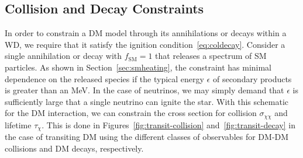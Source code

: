 \documentclass[preprintnumbers,amsmath,amssymb,prd,superscriptaddress]{revtex4}
\begin{document}
\subsection{Collision and Decay Constraints}
\label{sec:CollisionConstraints}

In order to constrain a DM model through its annihilations or decays within a WD, we require that it satisfy the ignition condition~\eqref{eq:coldecay}.
Consider a single annihilation or decay with $f_\text{SM} = 1$ that releases a spectrum of SM particles.
As shown in Section~\ref{sec:smheating}, the constraint has minimal dependence on the released species if the typical energy $\epsilon$ of secondary products is greater than an MeV.
In the case of neutrinos, we may simply demand that $\epsilon$ is sufficiently large that a single neutrino can ignite the star.
With this schematic for the DM interaction, we can constrain the cross section for collision $\sigma_{\chi \chi}$ and lifetime $\tau_\chi$.
This is done in Figures~\ref{fig:transit-collision} and~\ref{fig:transit-decay} in the case of transiting DM using the different classes of observables for DM-DM collisions and DM decays, respectively.
\end{document}
